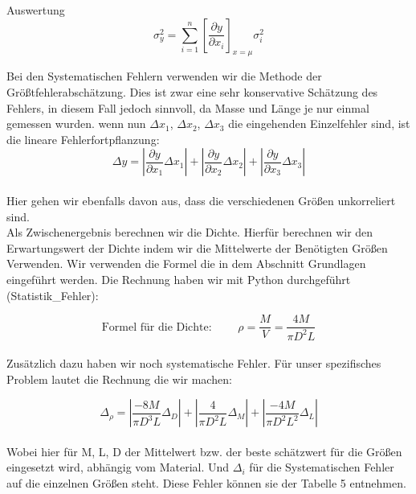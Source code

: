 \documentclass[twoside]{protokoll}
\begin{document}
\begin{aufgabe}{Auswertung}
\begin{equation}
	\sigma_y^2 = \sum_{i=1}^n\left[\frac{\partial y}{\partial x_i}\right]_{x=\mu}\sigma_{i}^2
\end{equation}

Bei den Systematischen Fehlern verwenden wir die Methode der Größtfehlerabschätzung. 
Dies ist zwar eine sehr konservative Schätzung des Fehlers, in diesem Fall jedoch sinnvoll,
da Masse und Länge je nur einmal gemessen wurden. wenn nun $\Delta x_1$, $\Delta x_2$, $\Delta x_3$
die eingehenden Einzelfehler sind, ist die lineare Fehlerfortpflanzung: \\

\begin{equation}
	\Delta y = \left|\frac{\partial y}{\partial x_1}\Delta x_1\right| + 
	\left|\frac{\partial y}{\partial x_2}\Delta x_2\right| + 
	\left|\frac{\partial y}{\partial x_3}\Delta x_3\right|
\end{equation}\\

Hier gehen wir ebenfalls davon aus, dass die verschiedenen Größen unkorreliert sind.  \\

Als Zwischenergebnis berechnen wir die Dichte. Hierfür berechnen wir den
Erwartungswert der Dichte indem wir die Mittelwerte der Benötigten Größen Verwenden. 
Wir verwenden die Formel die in dem Abschnitt Grundlagen eingeführt werden. Die Rechnung haben wir mit Python durchgeführt (Statistik\_Fehler):

\begin{equation}
    \text{Formel für die Dichte: }\qquad \rho = \frac{M}{V} = \frac{4M}{\pi D^2L}
\end{equation}\\

Zusätzlich dazu haben wir noch systematische Fehler. Für unser spezifisches Problem lautet die Rechnung die wir machen:

\begin{equation}
	\Delta_{\rho} = \left|\frac{-8M}{\pi D^3L}\Delta_D\right| + 
	\left|\frac{4}{\pi D^2L}\Delta_M\right| + 
	\left|\frac{-4M}{\pi D^2L^2}\Delta_L\right|
\end{equation}\\

Wobei hier für M, L, D der Mittelwert bzw. der beste schätzwert für die Größen eingesetzt wird, abhängig 
vom Material. Und $\Delta_i$ für die Systematischen Fehler auf die einzelnen Größen steht. 
Diese Fehler können sie der Tabelle 5 entnehmen. 


\end{aufgabe}
\end{document}
